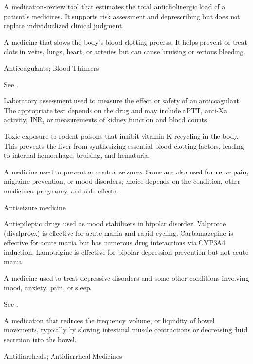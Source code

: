  A medication-review tool that estimates the total anticholinergic load of a patient's
medicines. It supports risk assessment and deprescribing but does not replace
individualized clinical judgment.

 A medicine that slows the body’s blood-clotting process. It helps prevent or treat clots in veins, lungs, heart, or arteries but can cause bruising or serious bleeding.

\synonyms
Anticoagulants; Blood Thinners

 See .

 Laboratory assessment used to measure the effect or safety of an anticoagulant. The
appropriate test depends on the drug and may include aPTT, anti-Xa activity, INR, or
measurements of kidney function and blood counts.

 Toxic exposure to rodent poisons that inhibit vitamin K recycling in the body. This prevents the liver from synthesizing essential blood-clotting factors, leading to internal hemorrhage, bruising, and hematuria.

 A medicine used to prevent or control seizures. Some are also used for nerve pain, migraine prevention, or mood disorders; choice depends on the condition, other medicines, pregnancy, and side effects.

\synonyms
Antiseizure medicine

 Antiepileptic drugs used as mood stabilizers in bipolar disorder. Valproate (divalproex)
is effective for acute mania and rapid cycling. Carbamazepine is effective for acute
mania but has numerous drug interactions via CYP3A4 induction. Lamotrigine is effective
for bipolar depression prevention but not acute mania.

 A medicine used to treat depressive disorders and some other conditions involving mood, anxiety, pain, or sleep.

 See .

 A medication that reduces the frequency, volume, or liquidity of bowel movements, typically by slowing intestinal muscle contractions or decreasing fluid secretion into the bowel.

\synonyms
Antidiarrheals; Antidiarrheal Medicines

